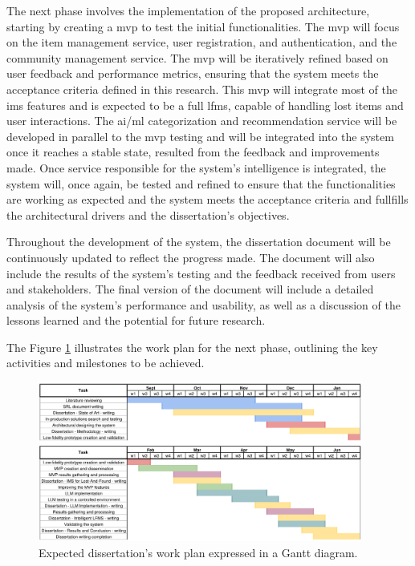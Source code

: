 The next phase involves the implementation of the proposed architecture, starting by creating a \ac{mvp} to test the initial functionalities. The \ac{mvp} will focus on the item management service, user registration, and authentication, and the community management service. The \ac{mvp} will be iteratively refined based on user feedback and performance metrics, ensuring that the system meets the acceptance criteria defined in this research. This \ac{mvp} will integrate most of the \ac{ims} features and is expected to be a full \ac{lfms}, capable of handling lost items and user interactions. The \ac{ai}/\ac{ml} categorization and recommendation service will be developed in parallel to the \ac{mvp} testing and will be integrated into the system once it reaches a stable state, resulted from the feedback and improvements made. Once service responsible for the system's intelligence is integrated, the system will, once again, be tested and refined to ensure that the functionalities are working as expected and the system meets the acceptance criteria and fullfills the architectural drivers and the dissertation's objectives.

Throughout the development of the system, the dissertation document will be continuously updated to reflect the progress made. The document will also include the results of the system's testing and the feedback received from users and stakeholders. The final version of the document will include a detailed analysis of the system's performance and usability, as well as a discussion of the lessons learned and the potential for future research.

The Figure \ref{fig:gantt_diagram} illustrates the work plan for the next phase, outlining the key activities and milestones to be achieved.

\begin{figure}[!htb]
    \includegraphics[width=0.95\textwidth]{figs/chapter3/gantt_diagram.png}
    \centering
    \caption[Expected dissertation's work plan expressed in a Gantt diagram]{Expected dissertation's work plan expressed in a Gantt diagram.}
    \label{fig:gantt_diagram}
\end{figure}

